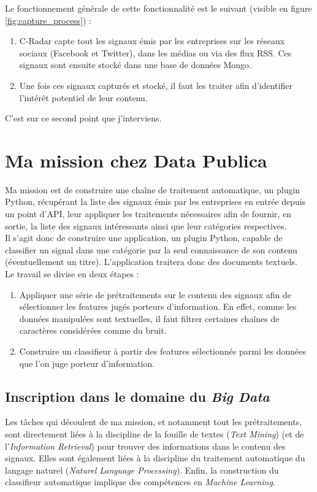     Le fonctionnement générale de cette fonctionnalité est le suivant (visible en figure \ref{fig:capture_process}) :
    \begin{enumerate}
        \item C-Radar capte tout les signaux émis par les entreprises sur les réseaux sociaux (Facebook et Twitter), dans les médias ou via des flux RSS. Ces signaux sont ensuite stocké dans une base de données Mongo.
        \item Une fois ces signaux capturés et stocké, il faut les traiter afin d'identifier l'intérêt potentiel de leur contenu.
    \end{enumerate}
    C'est sur ce second point que j'interviens.

\section{Ma mission chez Data Publica} %
\label{sec:ma_mission_chez_data_publica}
    Ma mission est de construire une chaîne de traitement automatique, un plugin Python, récupérant la liste des signaux émis par les entreprises en entrée depuis un point d'API, leur appliquer les traitements nécessaires afin de fournir, en sortie, la liste des signaux intéressants ainsi que leur catégories respectives.\\

    Il s'agit donc de construire une application, un plugin Python, capable de classifier un signal dans une catégorie par la seul connaissance de son contenu (éventuellement un titre). L'application traitera donc des documents textuels.\\
    Le travail se divise en deux étapes :
    \begin{enumerate}
        \item Appliquer une série de prétraitements sur le contenu des signaux afin de sélectionner les features jugés porteurs d'information. En effet, comme les données manipulées sont textuelles, il faut filtrer certaines chaînes de caractères considérées comme du bruit.
        \item Construire un classifieur à partir des features sélectionnés parmi les données que l'on juge porteur d'information.
    \end{enumerate}

    \subsection{Inscription dans le domaine du \textit{Big Data}}
        Les tâches qui découlent de ma mission, et notamment tout les prétraitements, sont directement liées à la discipline de la fouille de textes (\textit{Text Mining}) (et de l'\textit{Information Retrieval}) pour trouver des informations dans le contenu des signaux. Elles sont également liées à la discipline du traitement automatique du langage naturel (\textit{Naturel Language Processing}). Enfin, la construction du classifieur automatique implique des compétences en \textit{Machine Learning}.\\

